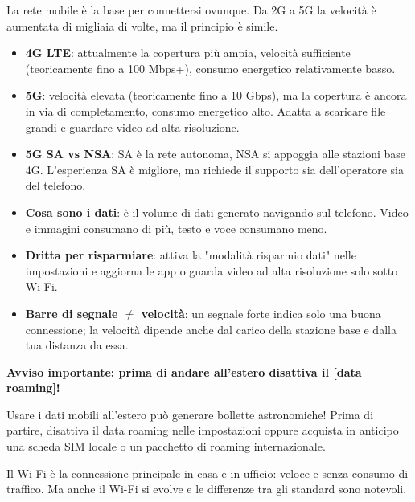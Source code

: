 
La rete mobile è la base per connettersi ovunque. Da 2G a 5G la velocità è aumentata di migliaia di volte, ma il principio è simile.


\begin{itemize}
  \item \textbf{4G LTE}: attualmente la copertura più ampia, velocità sufficiente (teoricamente fino a 100 Mbps+), consumo energetico relativamente basso.
  \item \textbf{5G}: velocità elevata (teoricamente fino a 10 Gbps), ma la copertura è ancora in via di completamento, consumo energetico alto. Adatta a scaricare file grandi e guardare video ad alta risoluzione.
  \item \textbf{5G SA vs NSA}: SA è la rete autonoma, NSA si appoggia alle stazioni base 4G. L'esperienza SA è migliore, ma richiede il supporto sia dell'operatore sia del telefono.
\end{itemize}


\begin{itemize}
  \item \textbf{Cosa sono i dati}: è il volume di dati generato navigando sul telefono. Video e immagini consumano di più, testo e voce consumano meno.
  \item \textbf{Dritta per risparmiare}: attiva la "modalità risparmio dati" nelle impostazioni e aggiorna le app o guarda video ad alta risoluzione solo sotto Wi-Fi.
  \item \textbf{Barre di segnale $\neq$ velocità}: un segnale forte indica solo una buona connessione; la velocità dipende anche dal carico della stazione base e dalla tua distanza da essa.
\end{itemize}

\textbf{Avviso importante: prima di andare all'estero disattiva il [data roaming]!}\par

Usare i dati mobili all'estero può generare bollette astronomiche! Prima di partire, disattiva il data roaming nelle impostazioni oppure acquista in anticipo una scheda SIM locale o un pacchetto di roaming internazionale.


Il Wi-Fi è la connessione principale in casa e in ufficio: veloce e senza consumo di traffico. Ma anche il Wi-Fi si evolve e le differenze tra gli standard sono notevoli.

